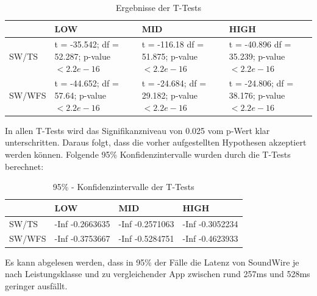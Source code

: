 \begin{table}[h]

\begin{tabular}{l|p{2cm}|p{2cm}|p{2cm}}
& LOW & MID & HIGH \\
\hline
SW/TS & t = -35.542; \newline df = 52.287; \newline p-value $< 2.2e-16$ & t = -116.18 \newline df = 51.875; \newline p-value $< 2.2e-16$ & t = -40.896 \newline df = 35.239; \newline p-value $< 2.2e-16$\\
\hline
SW/WFS & t = -44.652; \newline df = 57.64; \newline p-value $< 2.2e-16$ & t = -24.684; \newline df = 29.182; \newline p-value $< 2.2e-16$ & t = -24.806; \newline df = 38.176; \newline p-value $< 2.2e-16$ \\

\end{tabular}
\caption{Ergebnisse der T-Tests}
\end{table}

In allen T-Tests wird das Signifikanzniveau von 0.025 vom p-Wert klar unterschritten. Daraus folgt, dass die vorher aufgestellten Hypothesen akzeptiert werden können. Folgende 95\% Konfidenzintervalle wurden durch die T-Tests berechnet:

\begin{table}[h]

\begin{tabular}{l|p{2cm}|p{2cm}|p{2cm}}
& LOW & MID & HIGH \\
\hline
SW/TS & -Inf -0.2663635 & -Inf -0.2571063 & -Inf -0.3052234 \\
\hline
SW/WFS & -Inf -0.3753667 & -Inf -0.5284751 & -Inf -0.4623933 \\

\end{tabular}
\caption{95\% - Konfidenzintervalle der T-Tests}
\end{table}

Es kann abgelesen werden, dass in 95\% der Fälle die Latenz von SoundWire je nach Leistungsklasse und zu vergleichender App zwischen rund 257ms und 528ms geringer ausfällt.